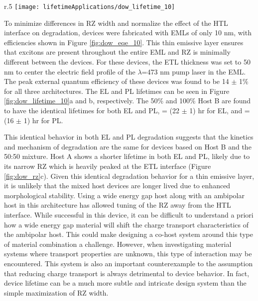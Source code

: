 \documentclass[../thesis.tex]{subfiles}
\begin{document}
\begin{wrapfigure}{r}{.5\textwidth}
\centering
\texttt{[image: lifetimeApplications/dow\_lifetime\_10]}
\caption{(a) EL and (b) PL lifetimes for the 10 nm EML devices.}
\label{fig:dow_lifetime_10}
\end{wrapfigure}

To minimize differences in RZ width and normalize the effect of the HTL interface on degradation, devices were fabricated with EMLs of only 10 nm, with efficiencies shown in Figure \ref{fig:dow_eqe_10}. 
This thin emissive layer ensures that excitons are present throughout the entire EML and RZ is minimally different between the devices. 
For these devices, the ETL thickness was set to 50 nm to center the electric field profile of the $\lambda$=473 nm pump laser in the EML. 
The peak external quantum efficiency of these devices was found to be 14 $\pm$ 1\% for all three architectures. 
The EL and PL lifetimes can be seen in Figure \ref{fig:dow_lifetime_10}a and b, respectively. The 50\% and 100\% Host B are found to have the identical lifetimes for both EL and PL,  = (22 $\pm$ 1) hr for EL, and  = (16 $\pm$ 1) hr for PL. 

This identical behavior in both EL and PL degradation suggests that the kinetics and mechanism of degradation are the same for devices based on Host B and the 50:50 mixture. 
Host A shows a shorter lifetime in both EL and PL, likely due to its narrow RZ which is heavily peaked at the ETL interface (Figure \ref{fig:dow_rz}c). 
Given this identical degradation behavior for a thin emissive layer, it is unlikely that the mixed host devices are longer lived due to enhanced morphological stability. 
Using a wide energy gap host along with an ambipolar host in this architecture has allowed tuning of the RZ away from the HTL interface. 
While successful in this device, it can be difficult to understand a priori how a wide energy gap material will shift the charge transport characteristics of the ambipolar host. 
This could make designing a co-host system around this type of material combination  a challenge. 
However, when investigating material systems where transport properties are unknown, this type of interaction may be encountered. 
This system is also an important counterexample to the assumption that reducing charge transport is always detrimental to device behavior. 
In fact, device lifetime can be a much more subtle and intricate design system than the simple maximization of RZ width. 
\end{document}
